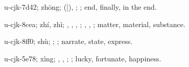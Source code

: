 \begin{multicols}{2}
{\cjkgGlue{}u-cjk-7d42; zhōng; \cjkgGlue{}\cjkgGlue{}(\cjkgGlue{}|\cjkgGlue{}), \cjkgGlue{}\cjkgGlue{}\cjkgGlue{}; \cjkgGlue{}; end, finally, in the end.

\cjkgGlue{}u-cjk-8cea; zhí, zhì; \cjkgGlue{}, \cjkgGlue{}\cjkgGlue{}\cjkgGlue{}, \cjkgGlue{}, \cjkgGlue{}; \cjkgGlue{}, \cjkgGlue{}, \cjkgGlue{}; matter, material, substance.

\cjkgGlue{}u-cjk-8ff0; shù; \cjkgGlue{}\cjkgGlue{}\cjkgGlue{}; \cjkgGlue{}; narrate, state, express.

\cjkgGlue{}u-cjk-5e78; xìng; \cjkgGlue{}\cjkgGlue{}\cjkgGlue{}, \cjkgGlue{}, \cjkgGlue{}\cjkgGlue{}\cjkgGlue{}; \cjkgGlue{}; lucky, fortunate, happiness.

}
\end{multicols}
